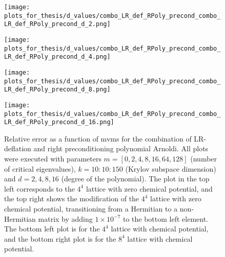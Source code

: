 \begin{figure}[H]
    \centering
    \begin{minipage}{0.45\textwidth}
        \centering
        \texttt{[image: plots\_for\_thesis/d\_values/combo\_LR\_def\_RPoly\_precond\_combo\_LR\_def\_RPoly\_precond\_d\_2.png]} %
    \end{minipage}%
    \hspace{0.02\textwidth} %
    \begin{minipage}{0.45\textwidth}
        \centering
        \texttt{[image: plots\_for\_thesis/d\_values/combo\_LR\_def\_RPoly\_precond\_combo\_LR\_def\_RPoly\_precond\_d\_4.png]} %
    \end{minipage}
    
    \vspace{0.02\textwidth} %
    
    \begin{minipage}{0.45\textwidth}
        \centering
        \texttt{[image: plots\_for\_thesis/d\_values/combo\_LR\_def\_RPoly\_precond\_combo\_LR\_def\_RPoly\_precond\_d\_8.png]} %
    \end{minipage}%
    \hspace{0.02\textwidth} %
    \begin{minipage}{0.45\textwidth}
        \centering
        \texttt{[image: plots\_for\_thesis/d\_values/combo\_LR\_def\_RPoly\_precond\_combo\_LR\_def\_RPoly\_precond\_d\_16.png]} %
    \end{minipage}
    
    \caption{\small Relative error as a function of mvms for the combination of LR-deflation and right preconditioning polynomial Arnoldi. All plots were executed with parameters $m = [0, 2, 4, 8, 16, 64, 128]$ (number of critical eigenvalues), $k = 10:10:150$ (Krylov subspace dimension) and $d = 2, 4, 8, 16$ (degree of the polynomial). The plot in the top left corresponds to the $4^4$ lattice with zero chemical potential, and the top right shows the modification of the $4^4$ lattice with zero chemical potential, transitioning from a Hermitian to a non-Hermitian matrix by adding $1 \times 10^{-7}$ to the bottom left element. The bottom left plot is for the $4^4$ lattice with chemical potential, and the bottom right plot is for the $8^4$ lattice with chemical potential.}
    \label{fig:d_combo_LR+right_pre_cond_mvms_plot}
\end{figure}
